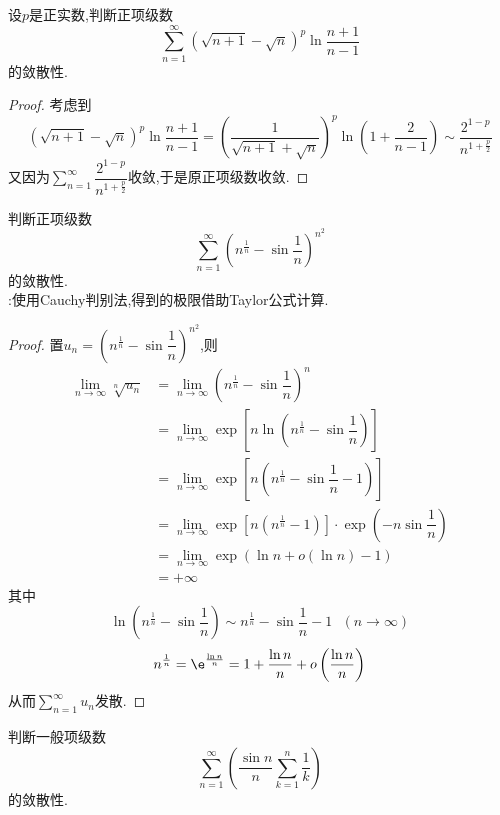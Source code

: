 \documentclass{ctexart}
\begin{document}
\pagestyle{empty}
\begin{center}
    \large{}
\end{center}
\begin{problem}[L.9.1]
    设$p$是正实数,判断正项级数
    \[\sum_{n=1}^\infty\left(\sqrt{n+1}-\sqrt n\right)^p\ln\dfrac{n+1}{n-1}\]
    的敛散性.
\end{problem}
\begin{proof}
    考虑到
    \[\left(\sqrt{n+1}-\sqrt n\right)^p\ln\dfrac{n+1}{n-1}=\left(\dfrac{1}{\sqrt{n+1}+\sqrt{n}}\right)^p\ln\left(1+\dfrac{2}{n-1}\right)\sim\dfrac{2^{1-p}}{n^{1+\frac p2}}\]
    又因为$\displaystyle\sum_{n=1}^{\infty}\dfrac{2^{1-p}}{n^{1+\frac p2}}$收敛,于是原正项级数收敛.
\end{proof}
\begin{problem}[L.9.2]
    判断正项级数
    \[\sum_{n=1}^\infty\left(n^\frac1n-\sin\dfrac1n\right)^{n^2}\]
    的敛散性.\\
    :使用Cauchy判别法,得到的极限借助Taylor公式计算.
\end{problem}
\begin{proof}
    置$u_n=\left(n^\frac1n-\sin\dfrac1n\right)^{n^2}$,则
    \[\begin{aligned}
        \lim_{n\to\infty}\sqrt[n]{u_n}
        &= \lim_{n\to\infty}\left(n^{\frac1n}-\sin\dfrac1n\right)^n \\
        &= \lim_{n\to\infty}\exp\left[n\ln\left(n^\frac1n-\sin\dfrac1n\right)\right] \\
        &= \lim_{n\to\infty}\exp\left[n\left(n^\frac1n-\sin\dfrac1n-1\right)\right] \\
        &= \lim_{n\to\infty}\exp\left[n\left(n^\frac1n-1\right)\right]\cdot\exp\left(-n\sin\dfrac1n\right) \\
        &= \lim_{n\to\infty}\exp\left(\ln n+o(\ln n)-1\right)\\
        &= +\infty
    \end{aligned}\]
    其中
    \[\ln\left(n^\frac1n-\sin\dfrac1n\right)\sim n^\frac1n-\sin\dfrac1n-1\ \ \ (n\to\infty)\]
    \[n^{\frac 1n}=\e^{\frac{\ln n}{n}}=1+\dfrac{\ln n}{n}+o\left(\dfrac{\ln n}{n}\right)\]
    从而$\displaystyle\sum_{n=1}^\infty u_n$发散.
\end{proof}
\begin{problem}[L.9.3]
    判断一般项级数
    \[\sum_{n=1}^\infty\left(\dfrac{\sin n}{n}\sum_{k=1}^{n}\dfrac1k\right)\]
    的敛散性.
\end{problem}
\end{document}
